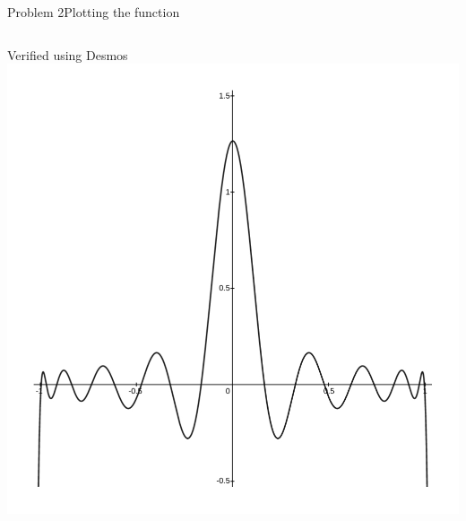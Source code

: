 \documentclass{beamer}
\begin{document}
\begin{frame}{Problem 2}{Plotting the function}
\begin{columns}
\begin{block}{\footnotesize Verified using Desmos}
            \includegraphics[width=\textwidth, trim={0 0.8cm 0 0.8cm}, clip]{Figures/prob2_functionplotdesmos2.jpg}
        \end{block}
    \end{columns}
\end{frame}
\end{document}
